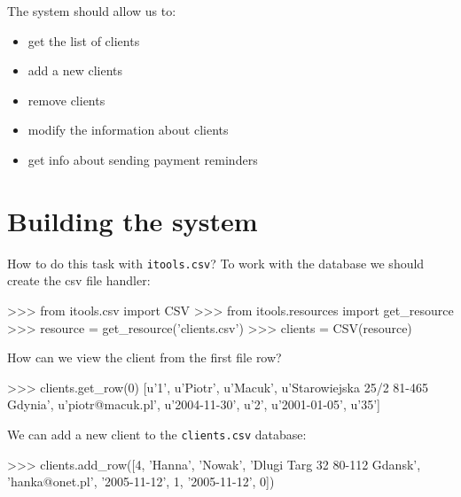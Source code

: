 \documentclass[a4paper]{book}
\begin{document}
The system should allow us to:
\begin{itemize}
    \item get the list of clients
    \item add a new clients
    \item remove clients 
    \item modify the information about clients
    \item get info about sending payment reminders 
\end{itemize}


\section{Building the system}

How to do this task with {\tt itools.csv}? To work with the
database we should create the csv file handler:
\begin{code}
    >>> from itools.csv import CSV
    >>> from itools.resources import get_resource
    >>> resource = get_resource('clients.csv')
    >>> clients = CSV(resource)
\end{code}

How can we view the client from the first file row?
\begin{code}
    >>> clients.get_row(0)
    [u'1', u'Piotr', u'Macuk', u'Starowiejska 25/2 81-465 Gdynia',
    u'piotr@macuk.pl', u'2004-11-30', u'2', u'2001-01-05', u'35']
\end{code}
    
We can add a new client to the {\tt clients.csv} database:
\begin{code}
    >>> clients.add_row([4, 'Hanna', 'Nowak', 'Dlugi Targ 32 80-112 Gdansk',
    'hanka@onet.pl', '2005-11-12', 1, '2005-11-12', 0])
\end{code}
\end{document}
